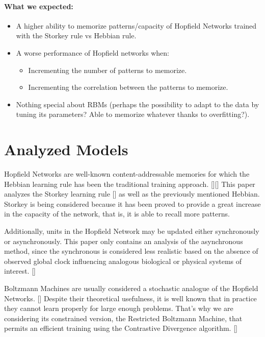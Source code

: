 \documentclass[anon]{CI}
\begin{document}
\paragraph{What we expected:} 
\begin{itemize}
	\item A higher ability to memorize patterns/capacity of Hopfield Networks trained with the Storkey rule vs Hebbian rule.
	\item A worse performance of Hopfield networks when:
	\begin{itemize}
		\item Incrementing the number of patterns to memorize.
		\item Incrementing the correlation between the patterns to memorize.
	\end{itemize}
	\item Nothing special about RBMs (perhaps the possibility to adapt to the data by tuning its parameters? Able to memorize whatever thanks to overfitting?).
\end{itemize}

\section{Analyzed Models}

Hopfield Networks are well-known content-addressable memories for which the Hebbian learning rule has been the traditional training approach. [\cite{hopfield1982neural}][\cite{Hebb1950}] This paper analyzes the Storkey learning rule [\cite{Storkey1997}] as well as the previously mentioned Hebbian. Storkey is being considered because it has been proved to provide a great increase in the capacity of the network, that is, it is able to recall more patterns.

Additionally, units in the Hopfield Network may be updated either synchronously or asynchronously. This paper only contains an analysis of the asynchronous method, since the synchronous is considered less realistic based on the absence of observed global clock influencing analogous biological or physical systems of interest. [\cite{MacKay2003}]

Boltzmann Machines are usually considered a stochastic analogue of the Hopfield Networks. [\cite{Ackley1985147}] Despite their theoretical usefulness, it is well known that in practice they cannot learn properly for large enough problems. That’s why we are considering its constrained version, the Restricted Boltzmann Machine, that permits an efficient training using the Contrastive Divergence algorithm. [\cite{carreira2005contrastive}]
\end{document}

